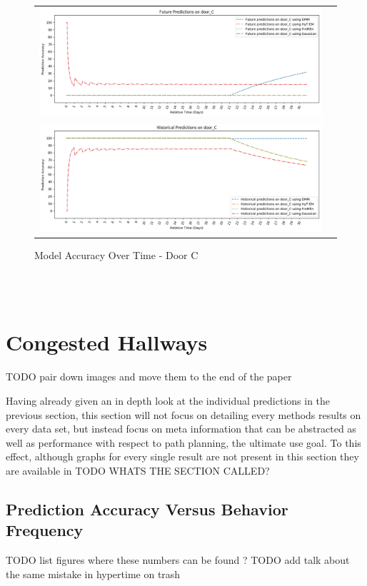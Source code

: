 \begin{center}
\begin{figure}[!Hp]
  \begin{tabular}{cc}
    {\includegraphics[width = 6in]{images/results/Future_Predictions_on_door_C.png}} \\
    {\includegraphics[width = 6in]{images/results/Historical_Predictions_on_door_C.png}} \\
  \end{tabular}
  \caption{Model Accuracy Over Time - Door C}
\end{figure}\\ \\
\end{center}


\section{ Congested Hallways }
TODO pair down images and move them to the end of the paper

Having already given an in depth look at the individual predictions in the
previous section, this section will not focus on detailing every methods results on every data set,
but instead focus on meta information that can be abstracted as well as
performance with respect to path planning, the ultimate use goal.
To this effect, although graphs for every single result are not
present in this section they are available in TODO WHATS THE SECTION CALLED? \\

\subsection{ Prediction Accuracy Versus Behavior Frequency }
TODO list figures where these numbers can be found ?
TODO add talk about the same mistake in hypertime on trash

